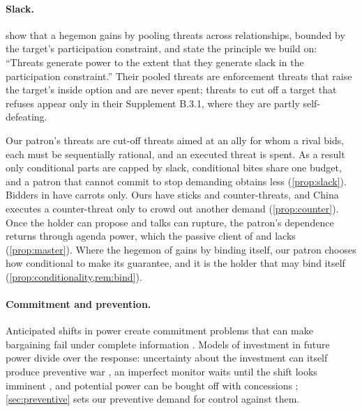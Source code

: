 \paragraph{Slack.} \citet{clayton2026framework} show that a hegemon gains by pooling threats across relationships, bounded by the target's participation constraint, and \citet{clayton2026putting} state the principle we build on: ``Threats generate power to the extent that they generate slack in the participation constraint.'' Their pooled threats are enforcement threats that raise the target's inside option and are never spent; threats to cut off a target that refuses appear only in their Supplement B.3.1, where they are partly self-defeating.

Our patron's threats are cut-off threats aimed at an ally for whom a rival bids, each must be sequentially rational, and an executed threat is spent. As a result only conditional parts are capped by slack, conditional bites share one budget, and a patron that cannot commit to stop demanding obtains less (\cref{prop:slack}). Bidders in \citet{bueno2016competition} have carrots only. Ours have sticks and counter-threats, and China executes a counter-threat only to crowd out another demand (\cref{prop:counter}). Once the holder can propose and talks can rupture, the patron's dependence returns through agenda power, which the passive client of \citet{groseclose1996buying} and \citet{dekel2008vote} lacks (\cref{prop:master}). Where the hegemon of \citet{clayton2026theory} gains by binding itself, our patron chooses how conditional to make its guarantee, and it is the holder that may bind itself (\cref{prop:conditionality,rem:bind}).

\paragraph{Commitment and prevention.} Anticipated shifts in power create commitment problems that can make bargaining fail under complete information \citep{fearon1995rationalist, powell2006war}. Models of investment in future power divide over the response: uncertainty about the investment can itself produce preventive war \citep{debs2014known}, an imperfect monitor waits until the shift looks imminent \citep{bas2016dynamic}, and potential power can be bought off with concessions \citep{spaniel2019bargaining}; \cref{sec:preventive} sets our preventive demand for control against them.
